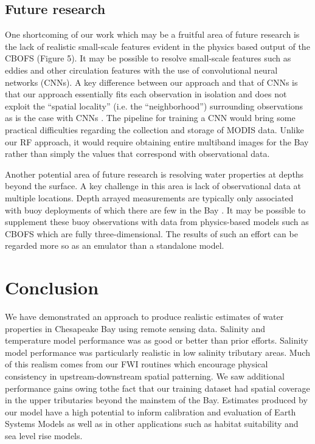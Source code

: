 \documentclass{article}
\begin{document}
\subsection{Future research}

One shortcoming of our work which may be a fruitful area of future research is the lack of realistic small-scale features evident in the physics based output of the CBOFS (Figure 5). It may be possible to resolve small-scale features such as eddies and other circulation features with the use of convolutional neural networks (CNNs). A key difference between our approach and that of CNNs is that our approach essentially fits each observation in isolation and does not exploit the “spatial locality” (i.e. the “neighborhood”) surrounding observations as is the case with CNNs \cite{goodfellow2016convolutional}. The pipeline for training a CNN would bring some practical difficulties regarding the collection and storage of MODIS data. Unlike our RF approach, it would require obtaining entire multiband images for the Bay rather than simply the values that correspond with observational data.

Another potential area of future research is resolving water properties at depths beyond the surface. A key challenge in this area is lack of observational data at multiple locations. Depth arrayed measurements are typically only associated with buoy deployments of which there are few in the Bay \cite{vogelAssessingSatelliteSea2016}. It may be possible to supplement these buoy observations with data from physics-based models such as CBOFS which are fully three-dimensional. The results of such an effort can be regarded more so as an emulator than a standalone model.


\section{Conclusion}

We have demonstrated an approach to produce realistic estimates of water properties in Chesapeake Bay using remote sensing data. Salinity and temperature model performance was as good or better than prior efforts. Salinity model performance was particularly realistic in low salinity tributary areas. Much of this realism comes from our FWI routines which encourage physical consistency in upstream-downstream spatial patterning. We saw additional performance gains owing tothe fact that our training dataset had spatial coverage in the upper tributaries beyond the mainstem of the Bay. Estimates produced by our model have a high potential to inform calibration and evaluation of Earth Systems Models as well as in other applications such as habitat suitability and sea level rise models.
\end{document}
